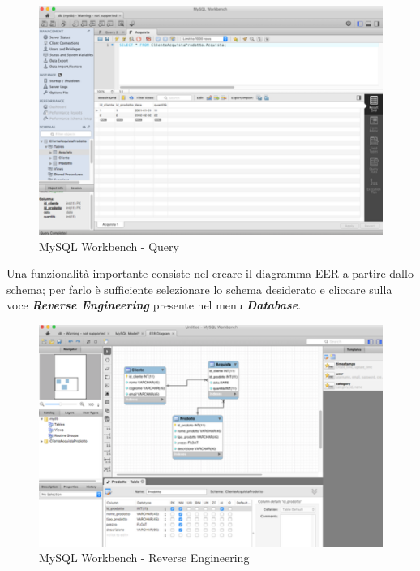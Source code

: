 \begin{center}
\begin{figure}[H]
\centering
\includegraphics[scale=0.8]{figures/mySQL_workbench_query.png}
\caption{MySQL Workbench - Query} 
\end{figure}
\end{center}

Una funzionalità importante consiste nel creare il diagramma EER a partire dallo schema; per farlo è sufficiente selezionare lo schema desiderato e cliccare sulla voce \textit{\textbf{Reverse Engineering}} presente nel menu \textit{\textbf{Database}}.

\begin{center}
\begin{figure}[H]
\centering
\includegraphics[scale=0.8]{figures/mySQL_workbench_reveng.png}
\caption{MySQL Workbench - Reverse Engineering} 
\end{figure}
\end{center}

